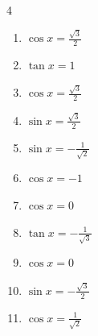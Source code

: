 \begin{multicols}{4}
\begin{enumerate}

  \item $\displaystyle \cos{x}  = \frac{\sqrt{3}}{2}$


  \item $\displaystyle \tan{x}  = 1$


  \item $\displaystyle \cos{x}  = \frac{\sqrt{3}}{2}$


  \item $\displaystyle \sin{x}  = \frac{\sqrt{3}}{2}$


  \item $\displaystyle \sin{x}  = -\frac{1}{\sqrt{2}}$


  \item $\displaystyle \cos{x}  = -1$


\columnbreak %

\resetques

  \item $\displaystyle \cos{x}  = 0$


  \item $\displaystyle \tan{x}  = -\frac{1}{\sqrt{3}}$


  \item $\displaystyle \cos{x}  = 0$


  \item $\displaystyle \sin{x}  = -\frac{\sqrt{3}}{2}$


  \item $\displaystyle \cos{x}  = \frac{1}{\sqrt{2}}$


\end{enumerate}
\end{multicols}
